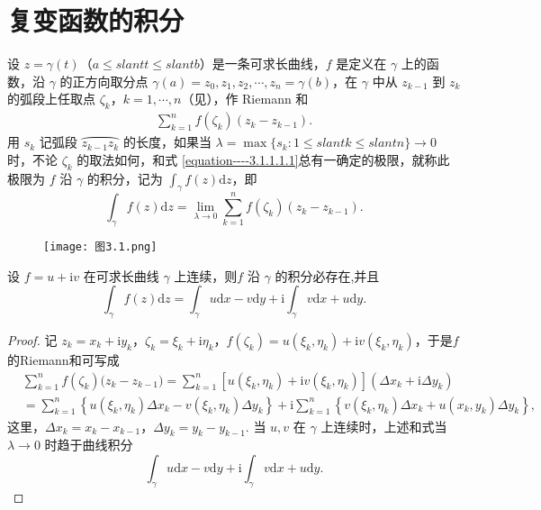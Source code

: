 \documentclass[../../main.tex]{subfiles}
\begin{document}
\section{复变函数的积分}

\begin{definition}
设 \( z = \gamma(t) \)（\( a \leqslant slant t \leqslant slant b \)）是一条可求长曲线，\( f \) 是定义在 \( \gamma \) 上的函数，沿 \( \gamma \) 的正方向取分点 \( \gamma(a) = z_0, z_1, z_2, \cdots, z_n = \gamma(b) \)，在 \( \gamma \) 中从 \( z_{k - 1} \) 到 \( z_k \) 的弧段上任取点 \( \zeta_k \)，\( k = 1, \cdots, n \)（见），作 Riemann 和
\begin{align}\label{equation----3.1.1.1.1}
\sum_{k = 1}^n f(\zeta_k)(z_k - z_{k - 1}). 
\end{align}
用 \( s_k \) 记弧段 \( \wideparen{z_{k - 1}z_k} \) 的长度，如果当 \( \lambda = \max\{s_k: 1 \leqslant slant k \leqslant slant n\} \to 0 \) 时，不论 \( \zeta_k \) 的取法如何，和式 \eqref{equation----3.1.1.1.1}总有一确定的极限，就称此极限为 \( f \) 沿 \( \gamma \) 的积分，记为 \( \int_\gamma f(z)\mathrm{d}z \)，即
\[
\int_\gamma f(z)\mathrm{d}z = \lim_{\lambda \to 0} \sum_{k = 1}^n f(\zeta_k)(z_k - z_{k - 1}).
\]
\end{definition}

\begin{figure}[H]
\centering
\texttt{[image: 图3.1.png]}
\caption{}
\label{figure:图3.1}
\end{figure}

\begin{proposition}\label{proposition:连续复变函数积分必存在}
设 \( f = u + \mathrm{i}v \) 在可求长曲线 \( \gamma \) 上连续，则\( f \) 沿 \( \gamma \) 的积分必存在,并且
\[
\int_\gamma f(z)\mathrm{d}z = \int_\gamma u \mathrm{d}x - v \mathrm{d}y + \mathrm{i}\int_\gamma v \mathrm{d}x + u \mathrm{d}y.
\]
\end{proposition}
\begin{proof}
记 \( z_k = x_k + \mathrm{i}y_k \)，\( \zeta_k = \xi_k + \mathrm{i}\eta_k \)，\( f(\zeta_k) = u(\xi_k, \eta_k) + \mathrm{i}v(\xi_k, \eta_k) \)，于是$f$的Riemann和可写成
\begin{align*}
&\sum_{k=1}^n{f(\zeta _k)(z_k}-z_{k-1})=\sum_{k=1}^n{\left[ u\left( \xi _k,\eta _k \right) +\mathrm{i}v\left( \xi _k,\eta _k \right) \right] \left( \Delta x_k+\mathrm{i}\Delta y_k \right)}
\\
&=\sum_{k=1}^n{\left\{ u(\xi _k,\eta _k)\Delta x_k-v(\xi _k,\eta _k)\Delta y_k \right\}}+\mathrm{i}\sum_{k=1}^n{\left\{ v(\xi _k,\eta _k)\Delta x_k+u(x_k,y_k)\Delta y_k \right\}},
\end{align*}
这里，\( \Delta x_k = x_k - x_{k - 1} \)，\( \Delta y_k = y_k - y_{k - 1} \). 当 \( u, v \) 在 \( \gamma \) 上连续时，上述和式当 \( \lambda \to 0 \) 时趋于曲线积分
\[
\int_\gamma u \mathrm{d}x - v \mathrm{d}y + \mathrm{i}\int_\gamma v \mathrm{d}x + u \mathrm{d}y.
\]
\end{proof}
\end{document}
